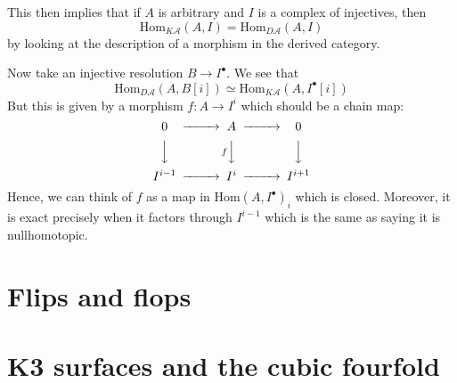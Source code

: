 This then implies that if $A$ is arbitrary and $I$ is a complex of injectives, then $$\mathrm{Hom}_{K\mathcal{A}}(A,I)=\mathrm{Hom}_{D\mathcal{A}}(A,I)$$by looking at the description of a morphism in the derived category.

Now take an injective resolution $B\rightarrow I^\bullet$. We see that $$\mathrm{Hom}_{D\mathcal{A}}(A,B[i])\simeq \mathrm{Hom}_{K\mathcal{A}}(A,I^\bullet[i])$$But this is given by a morphism $f:A\rightarrow I^i$ which should be a chain map: 
$$\begin{CD}0 @> > > A @> > > 0 \\ @VVV @VfVV @VVV \\ I^{i-1} @> > > I^i @> > > I^{i+1} \end{CD}$$
Hence, we can think of $f$ as a map in $\mathrm{Hom}(A, I^\bullet)_{i}$ which is closed. Moreover, it is exact precisely when it factors through $I^{i-1}$ which is the same as saying it is nullhomotopic. 






\section{Flips and flops}


\section{K3 surfaces and the cubic fourfold}

